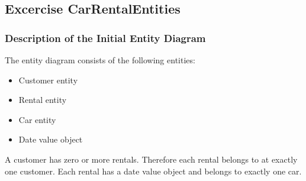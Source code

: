 \label{cha:design_of_data_and_functionality}

\subsection{Excercise CarRentalEntities}
\label{sec:exercise_car_rental_entities}
\subsubsection*{Description of the Initial Entity Diagram}
The entity diagram consists of the following entities:
\begin{itemize}
    \item Customer entity
    \item Rental entity
    \item Car entity
    \item Date value object
\end{itemize}
A customer has zero or more rentals.
Therefore each rental belongs to at exactly one customer.
Each rental has a date value object and belongs to exactly one car.

